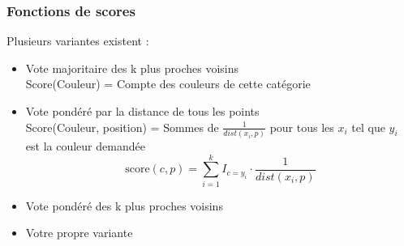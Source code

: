 \documentclass[french]{beamer}
\begin{document}
\begin{frame}
\frametitle{Fonctions de scores}
Plusieurs variantes existent :
\begin{itemize}

\pause
\item{Vote majoritaire des k plus proches voisins}\\
Score(Couleur) = Compte des couleurs de cette catégorie

\pause
\item{Vote pondéré par la distance de tous les points}\\

Score(Couleur, position) = Sommes de $\frac{1}{dist(x_i,p)}$ pour tous les $x_i$ tel que $y_i$ est la couleur demandée
\pause
$$\text{score}(c, p) = \sum_{i=1}^k I_{c=y_i} \cdot \frac{1}{dist{(x_i,p)}}$$

\pause
\item{Vote pondéré des k plus proches voisins}\\

\pause
\item{Votre propre variante}\\

\end{itemize}

\end{frame}
\end{document}

